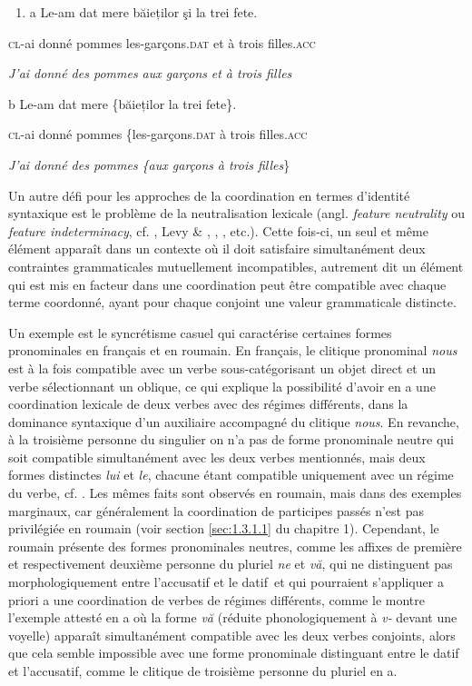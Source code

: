 \begin{enumerate}
\item \label{bkm:Ref300653737}a  Le-am  dat  mere  băieților  şi  la  trei  fete.


\end{enumerate}
\textsc{cl}-ai  donné  pommes  les-garçons.\textsc{dat } et  à  trois  filles\textsc{.acc}

  \textit{J'ai donné des pommes aux garçons}\textsc{} \textit{et à trois filles}

b  Le-am  dat  mere  \{băieților  {\textbar} la  trei  fete\}.

  \textsc{cl}-ai  donné  pommes  \{les-garçons.\textsc{dat  {\textbar}} à  trois  filles\textsc{.acc}

    \textit{J'ai donné des pommes \{aux garçons}\textsc{} \textit{{\textbar} à trois filles}\textsc{\}}

Un autre défi pour les approches de la coordination en termes d'identité syntaxique est le problème de la neutralisation lexicale (angl. \textit{feature neutrality} ou \textit{feature indeterminacy}, cf. \citet{Daniels2002}, Levy \& \citet{Pollard2002}, \citet{Sag2005}, \citet{Crysmann2006}, etc.). Cette fois-ci, un seul et même élément apparaît dans un contexte où il doit satisfaire simultanément deux contraintes grammaticales mutuellement incompatibles, autrement dit un élément qui est mis en facteur dans une coordination peut être compatible avec chaque terme coordonné, ayant pour chaque conjoint une valeur grammaticale distincte. 

Un exemple est le syncrétisme casuel qui caractérise certaines formes pronominales en français et en roumain. En français, le clitique pronominal \textit{nous} est à la fois compatible avec un verbe sous-catégorisant un objet direct et un verbe sélectionnant un oblique, ce qui explique la possibilité d'avoir en a une coordination lexicale de deux verbes avec des régimes différents, dans la dominance syntaxique d'un auxiliaire accompagné du clitique \textit{nous}. En revanche, à la troisième personne du singulier on n'a pas de forme pronominale neutre qui soit compatible simultanément avec les deux verbes mentionnés, mais deux formes distinctes \textit{lui} et \textit{le}, chacune étant compatible uniquement avec un régime du verbe, cf. . Les mêmes faits sont observés en roumain, mais dans des exemples marginaux, car généralement la coordination de participes passés n'est pas privilégiée en roumain (voir section \ref{sec:1.3.1.1} du chapitre 1). Cependant, le roumain présente des formes pronominales neutres, comme les affixes de première et respectivement deuxième personne du pluriel \textit{ne} et \textit{vă}, qui ne distinguent pas morphologiquement entre l'accusatif et le datif~et qui pourraient s'appliquer a priori a une coordination de verbes de régimes différents, comme le montre l'exemple attesté en a où la forme \textit{vă} (réduite phonologiquement à \textit{v-} devant une voyelle) apparaît simultanément compatible avec les deux verbes conjoints, alors que cela semble impossible avec une forme pronominale distinguant entre le datif et l'accusatif, comme le clitique de troisième personne du pluriel en a. 


